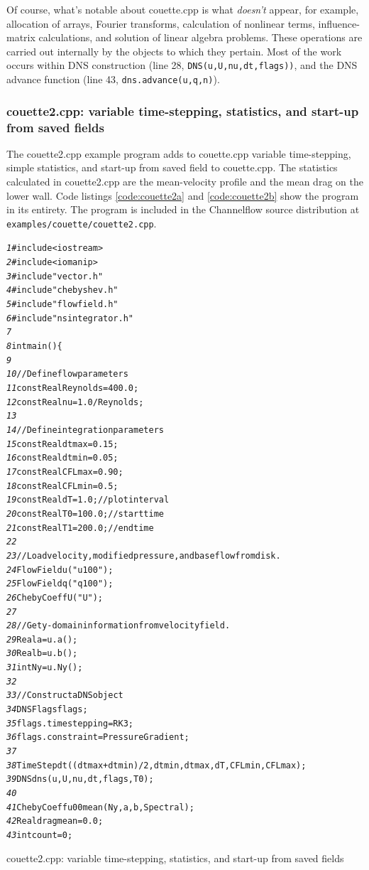 \documentclass{article}[12pt]
\begin{document}
\vspace{0.1in}
Of course, what's notable about couette.cpp is what {\em doesn't}
appear, for example, allocation of arrays, Fourier transforms,
calculation of nonlinear terms, influence-matrix calculations, and
solution of linear algebra problems. These operations are carried out
internally by the objects to which they pertain. Most of the work
occurs within DNS construction (line 28, {\tt DNS(u,U,nu,dt,flags))},
and the DNS advance function (line 43, {\tt dns.advance(u,q,n)}).

\subsubsection{couette2.cpp: variable time-stepping, statistics, and start-up
from saved fields}
\label{sec:couette2}

The couette2.cpp example program adds to couette.cpp variable time-stepping,
simple statistics, and start-up from saved field to couette.cpp. The
statistics calculated in couette2.cpp are the mean-velocity profile and the
mean drag on the lower wall. Code listings \ref{code:couette2a} and
\ref{code:couette2b} show the program in its entirety. The program is
included in the Channelflow source distribution at
{\tt examples/couette/couette2.cpp}.


\begin{Code listing}
\begin{alltt}
\small
{\it  1}  #include <iostream>
{\it  2}  #include <iomanip>
{\it  3}  #include "vector.h"
{\it  4}  #include "chebyshev.h"
{\it  5}  #include "flowfield.h"
{\it  6}  #include "nsintegrator.h"
{\it  7}
{\it  8}  int main() \{
{\it  9}
{\it 10}    // Define flow parameters
{\it 11}    const Real Reynolds = 400.0;
{\it 12}    const Real nu = 1.0/Reynolds;
{\it 13}
{\it 14}    // Define integration parameters
{\it 15}    const Real dtmax = 0.15;
{\it 16}    const Real dtmin = 0.05;
{\it 17}    const Real CFLmax = 0.90;
{\it 18}    const Real CFLmin = 0.5;
{\it 19}    const Real dT  = 1.0;     // plot interval
{\it 20}    const Real T0  = 100.0;    // start time
{\it 21}    const Real T1  = 200.0;    // end time
{\it 22}
{\it 23}    // Load velocity, modified pressure, and base flow from disk.
{\it 24}    FlowField u("u100");
{\it 25}    FlowField q("q100");
{\it 26}    ChebyCoeff U("U");
{\it 27}
{\it 28}    // Get y-domain information from velocity field.
{\it 29}    Real a = u.a();
{\it 30}    Real b = u.b();
{\it 31}    int Ny = u.Ny();
{\it 32}
{\it 33}    // Construct a DNS object
{\it 34}    DNSFlags flags;
{\it 35}    flags.timestepping = RK3;
{\it 36}    flags.constraint = PressureGradient;
{\it 37}
{\it 38}    TimeStep dt((dtmax+dtmin)/2, dtmin, dtmax, dT, CFLmin, CFLmax);
{\it 39}    DNS dns(u, U, nu, dt, flags, T0);
{\it 40}
{\it 41}    ChebyCoeff u00mean(Ny,a,b,Spectral);
{\it 42}    Real dragmean = 0.0;
{\it 43}    int count = 0;
\end{alltt}
\normalsize
\caption{couette2.cpp: variable time-stepping, statistics,
and start-up from saved fields}
\label{code:couette2a}
\end{Code listing}
\end{document}

